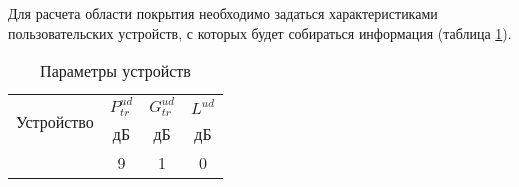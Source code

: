 Для расчета области покрытия необходимо задаться характеристиками пользовательских устройств, с которых будет собираться информация (таблица \cref{tab:part4_user_device_parameters_mip}).


\begin{table}[h!]\centering
  \begin{tabular}{|c||c|c|c|}\hline    
    \multirow{2}{*}{Устройство}&	$P_{tr}^{ud}$&	$G_{tr}^{ud}$&	$L^{ud}$ \\ \cline{2-4}
    &	дБ&	дБ&	дБ	 \\ \cline{2-4}
    &	9&	1&	0 \\
    \hline
  \end{tabular}\caption{Параметры устройств}\label{tab:part4_user_device_parameters_mip}
\end{table}








